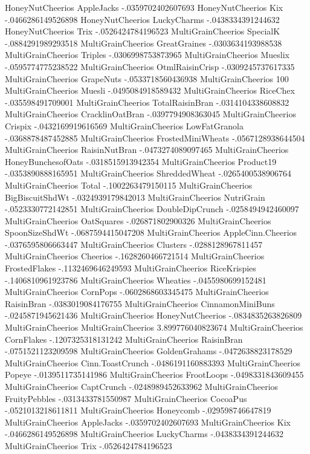 HoneyNutCheerios	AppleJacks	-.0359702402607693
HoneyNutCheerios	Kix	-.0466286149526898
HoneyNutCheerios	LuckyCharms	-.0438334391244632
HoneyNutCheerios	Trix	-.0526424784196523
MultiGrainCheerios	SpecialK	-.0884291989293518
MultiGrainCheerios	GreatGraines	-.0303634193988538
MultiGrainCheerios	Triples	-.0306998753873965
MultiGrainCheerios	Mueslix	-.0595774775238522
MultiGrainCheerios	OtmlRaisinCrisp	-.0309245737617335
MultiGrainCheerios	GrapeNuts	-.0533718560436938
MultiGrainCheerios	100%
MultiGrainCheerios	Muesli	-.0495084918589432
MultiGrainCheerios	RiceChex	-.035598491709001
MultiGrainCheerios	TotalRaisinBran	-.0314104338608832
MultiGrainCheerios	CracklinOatBran	-.0397794908363045
MultiGrainCheerios	Crispix	-.0432169919616569
MultiGrainCheerios	LowFatGranola	-.0368878487452885
MultiGrainCheerios	FrostedMiniWheats	-.0567128938644504
MultiGrainCheerios	RaisinNutBran	-.0473274089097465
MultiGrainCheerios	HoneyBunchesofOats	-.0318515913942354
MultiGrainCheerios	Product19	-.0353890888165951
MultiGrainCheerios	ShreddedWheat	-.0265400538906764
MultiGrainCheerios	Total	-.1002263479150115
MultiGrainCheerios	BigBiscuitShdWt	-.0324939179842013
MultiGrainCheerios	NutriGrain	-.0523330772142851
MultiGrainCheerios	DoubleDipCrunch	-.0258494942460097
MultiGrainCheerios	OatSquares	-.026871802900326
MultiGrainCheerios	SpoonSizeShdWt	-.0687594415047208
MultiGrainCheerios	AppleCinn.Cheerios	-.0376595806663447
MultiGrainCheerios	Clusters	-.0288128967811457
MultiGrainCheerios	Cheerios	-.1628260466721514
MultiGrainCheerios	FrostedFlakes	-.1132469646249593
MultiGrainCheerios	RiceKrispies	-.1406810961923786
MultiGrainCheerios	Wheaties	-.0455980699152481
MultiGrainCheerios	CornPops	-.0602868603345475
MultiGrainCheerios	RaisinBran	-.0383019084176755
MultiGrainCheerios	CinnamonMiniBuns	-.0245871945621436
MultiGrainCheerios	HoneyNutCheerios	-.0834835263826809
MultiGrainCheerios	MultiGrainCheerios	3.899776040823674
MultiGrainCheerios	CornFlakes	-.1207325318131242
MultiGrainCheerios	RaisinBran	-.0751521123209598
MultiGrainCheerios	GoldenGrahams	-.0472638823178529
MultiGrainCheerios	Cinn.ToastCrunch	-.0486191160883393
MultiGrainCheerios	Popeye	-.0139511735141986
MultiGrainCheerios	FrootLoops	-.0498331843609455
MultiGrainCheerios	CaptCrunch	-.0248989452633962
MultiGrainCheerios	FruityPebbles	-.0313433781550987
MultiGrainCheerios	CocoaPus	-.0521013218611811
MultiGrainCheerios	Honeycomb	-.029598746647819
MultiGrainCheerios	AppleJacks	-.0359702402607693
MultiGrainCheerios	Kix	-.0466286149526898
MultiGrainCheerios	LuckyCharms	-.0438334391244632
MultiGrainCheerios	Trix	-.0526424784196523

